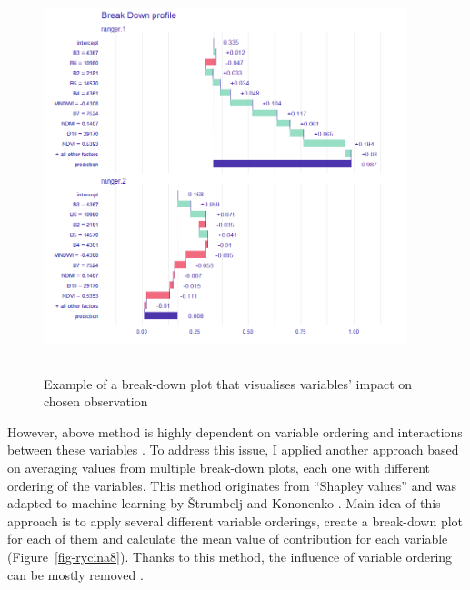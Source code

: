 \documentclass{amuthesis}
\begin{document}
\begin{figure}[H]

{\centering \includegraphics[width=4.16667in,height=4.45833in]{./figures/break-down_plot.png}

}

\caption{\label{fig-rycina7}Example of a break-down plot that visualises
variables' impact on chosen observation}

\end{figure}

However, above method is highly dependent on variable ordering and
interactions between these variables \autocite{biecek_explanatory_2021}.
To address this issue, I applied another approach based on averaging
values from multiple break-down plots, each one with different ordering
of the variables. This method originates from ``Shapley values''
\autocite{shapley_value_1953} and was adapted to machine learning by
Štrumbelj and Kononenko \autocite*{strumbelj_efficient_2010}. Main idea
of this approach is to apply several different variable orderings,
create a break-down plot for each of them and calculate the mean value
of contribution for each variable (Figure~\ref{fig-rycina8}). Thanks to
this method, the influence of variable ordering can be mostly removed
\autocite{biecek_explanatory_2021}.
\end{document}

